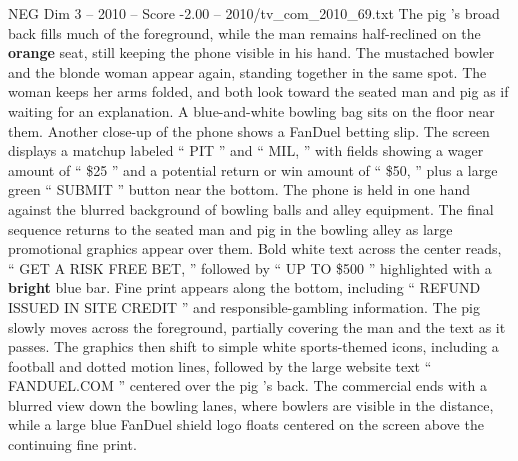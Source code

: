 \begin{textsample}{NEG Dim 3 – 2010 – Score -2.00 – 2010/tv\_com\_2010\_69.txt}
The pig ’s broad back fills much of the foreground, while the man remains half-reclined on the \textbf{orange} seat, still keeping the phone visible in his hand.
The mustached bowler and the blonde woman appear again, standing together in the same spot.
The woman keeps her arms folded, and both look toward the seated man and pig as if waiting for an explanation.
A blue-and-white bowling bag sits on the floor near them.
Another close-up of the phone shows a FanDuel betting slip.
The screen displays a matchup labeled “ PIT ” and “ MIL, ” with fields showing a wager amount of “ \$25 ” and a potential return or win amount of “ \$50, ” plus a large green “ SUBMIT ” button near the bottom.
The phone is held in one hand against the blurred background of bowling balls and alley equipment.
The final sequence returns to the seated man and pig in the bowling alley as large promotional graphics appear over them.
Bold white text across the center reads, “ GET A RISK FREE BET, ” followed by “ UP TO \$500 ” highlighted with a \textbf{bright} blue bar.
Fine print appears along the bottom, including “ REFUND ISSUED IN SITE CREDIT ” and responsible-gambling information.
The pig slowly moves across the foreground, partially covering the man and the text as it passes.
The graphics then shift to simple white sports-themed icons, including a football and dotted motion lines, followed by the large website text “ FANDUEL.COM ” centered over the pig ’s back.
The commercial ends with a blurred view down the bowling lanes, where bowlers are visible in the distance, while a large blue FanDuel shield logo floats centered on the screen above the continuing fine print.

\end{textsample}
